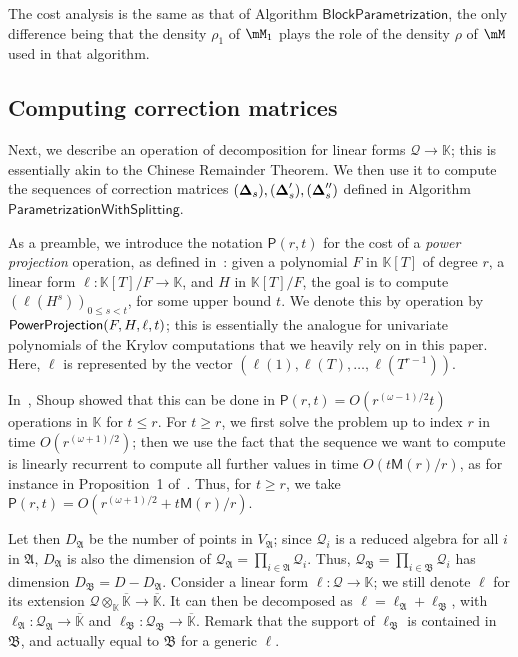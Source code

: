 \documentclass[12pt]{article}
\newcommand{\mat}[1]{\bm{\MakeUppercase{#1}}} %
\newcommand{\mainalgoname}{\mathsf{ BlockParametrization}}
\newcommand{\residueI}{\mathscr{Q}}
\def\M {\ensuremath{\mathsf{M}}}
\def\PP {\ensuremath{\mathsf{P}}}
\def\K{\mathbb{K}}
\def\K {\ensuremath{\mathbb{K}}}
\def\Kbar {{\ensuremath{\overline{\mathbb{K}}}}}
\begin{document}
The cost analysis is the same as that of Algorithm $\mainalgoname$, the
only difference being that the density $\rho_1$ of $\mM_1$ plays the 
role of the density $\rho$ of $\mM$ used in that algorithm.


\subsection{Computing correction matrices}

Next, we describe an operation of decomposition for linear forms
$\residueI \to \K$; this is essentially akin to the Chinese Remainder
Theorem. We then use it to compute the sequences of correction
matrices $(\mat{\Delta}_s),(\mat{\Delta}'_s),(\mat{\Delta}''_s)$
defined in Algorithm $\mathsf{ParametrizationWithSplitting}$.

As a preamble, we introduce the notation $\PP(r,t)$ for the cost of a
{\em power projection} operation, as defined
in~\cite{Shoup94,Shoup99}: given a polynomial $F$ in $\K[T]$ of degree
$r$, a linear form $\ell: \K[T]/F \to \K$, and $H$ in $\K[T]/F$, the
goal is to compute $(\ell(H^s))_{0 \le s < t}$, for some upper bound
$t$. We denote this by operation by ${\sf PowerProjection}(F,H,\ell,t)$; this is
essentially the analogue for univariate polynomials of the Krylov
computations that we heavily rely on in this paper. Here, $\ell$ 
is represented by the vector $(\ell(1),\ell(T),\dots,\ell(T^{r-1}))$.

In~\cite[Theorem~4]{Shoup94}, Shoup showed that this can be done in
$\PP(r,t)=O(r^{(\omega-1)/2} t)$ operations in $\K$ for $t \le r$. For
$t \ge r$, we first solve the problem up to index $r$ in time
$O(r^{(\omega+1)/2})$; then we use the fact that the sequence we want to
compute is linearly recurrent to compute all further values in time
$O(t\M(r)/r)$, as for instance in Proposition~1 of~\cite{BoFlSaSc06}.
Thus, for $t \ge r$, we take $\PP(r,t)=O(r^{(\omega+1)/2} +
t\M(r)/r)$.

\medskip

Let then $D_{\mathfrak{A}}$ be the number of points in
$V_{\mathfrak{A}}$; since $\residueI_i$ is a reduced algebra for all
$i$ in $\mathfrak{A}$, $D_\mathfrak{A}$ is also the dimension of
$\residueI_\mathfrak{A} = \prod_{i \in \mathfrak{A}}
\residueI_i$. Thus, $\residueI_\mathfrak{B}=\prod_{i \in \mathfrak{B}}
\residueI_i$ has dimension $D_{\mathfrak{B}}=D-D_{\mathfrak{A}}$.
Consider a linear form $\ell: \residueI \to \K$; we still denote
$\ell$ for its extension $\residueI \otimes_\K \Kbar \to \Kbar$.  It
can then be decomposed as $\ell= \ell_{\mathfrak{A}} +
\ell_{\mathfrak{B}}$, with $\ell_\mathfrak{A}: \residueI_\mathfrak{A}
\to \Kbar$ and $\ell_\mathfrak{B}: \residueI_\mathfrak{B} \to \Kbar$.
Remark that the support of $\ell_\mathfrak{B}$ is contained in
$\mathfrak{B}$, and actually equal to $\mathfrak{B}$ for a generic
$\ell$.
\end{document}
